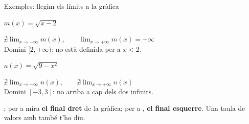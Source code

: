 \begin{fmexfill}{Exemples: llegim els límits a la gràfica}
\begin{minipage}[t][\tcbtextheight][s]{\linewidth}
\noindent \begin{minipage}[t]{0.48\linewidth}\centering $m(x)=\sqrt{x-2}$\par\smallskip {}\par\smallskip $\displaystyle\nexists\lim_{x\to-\infty}m(x),\qquad\lim_{x\to+\infty}m(x)=+\infty$\\ \vspace*{0.2cm} Domini $[2,+\infty)$: no està definida per a $x<2$.\end{minipage}\hfill\begin{minipage}[t]{0.48\linewidth}\centering $n(x)=\sqrt{9-x^2}$\par\smallskip {}\par\smallskip $\displaystyle\nexists\lim_{x\to-\infty}n(x),\qquad\nexists\lim_{x\to+\infty}n(x)$\\ \vspace*{0.2cm} Domini $[-3,3]$: no arriba a cap dels dos infinits.\end{minipage}\par
\vfill

      
\begin{fmnote}: per a  mira \textbf{el final dret} de la gràfica; per a , \textbf{el final esquerre}. Una taula de valors amb  també t'ho diu.\end{fmnote}
\end{minipage}
\end{fmexfill}
